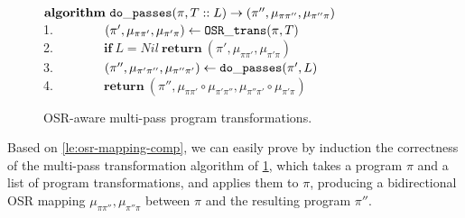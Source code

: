 \else
\begin{figure}
\noindent
\begin{small}
\hphantom{xxx} $\textbf{algorithm}~{\tt do\_passes}(\pi, T::L)\rightarrow (\pi'',\mu_{\pi\pi''},\mu_{\pi''\pi})$ \\
1. ~~ ~~~~ $(\pi',\mu_{\pi\pi'},\mu_{\pi'\pi})\gets {\tt OSR\_trans}(\pi,T)$ \\
2. ~~ ~~~~ $\textbf{if}~L=Nil~\textbf{return}~ (\pi',\mu_{\pi\pi'},\mu_{\pi'\pi})$ \\
3. ~~ ~~~~ $(\pi'',\mu_{\pi'\pi''},\mu_{\pi''\pi'})\gets {\tt do\_passes}(\pi',L)$ \\
4. ~~ ~~~~ $\textbf{return}~(\pi'',\mu_{\pi\pi'}\circ\mu_{\pi'\pi''},\mu_{\pi''\pi'}\circ\mu_{\pi'\pi})$ \\
\end{small}
\caption{OSR-aware multi-pass program transformations.}
\label{alg:osr-trans-compose}
\end{figure}
\fi

\noindent Based on \ref{le:osr-mapping-comp}, we can easily prove by induction the correctness of the multi-pass transformation algorithm of \myalgorithm\ref{alg:osr-trans-compose}, which takes a program $\pi$ and a list of program transformations, and applies them to $\pi$, producing a bidirectional OSR mapping $\mu_{\pi\pi''},\mu_{\pi''\pi}$ between $\pi$ and the resulting program $\pi''$.